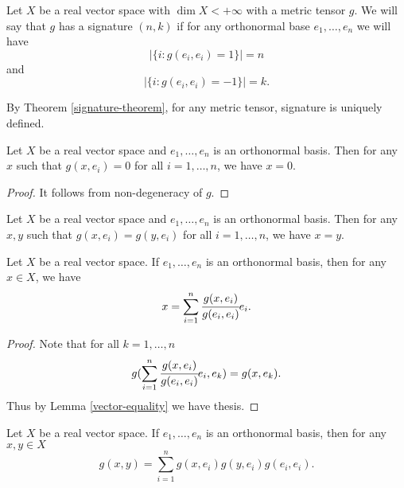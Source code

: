 \documentclass[main.tex]{subfiles}
\begin{document}
\begin{definition}
Let $X$ be a real vector space with $\dim X < +\infty$ with a metric tensor $g$. We will say that $g$ has a signature $(n, k)$ if for any orthonormal base $e_1, \dots, e_n$ we will have 
\begin{equation}
|\{i: g(e_i, e_i) = 1 \}| = n
\end{equation}
and
\begin{equation}
|\{i: g(e_i, e_i) = -1 \}| = k.
\end{equation}
\end{definition}

By Theorem \ref{signature-theorem}, for any metric tensor, signature is uniquely defined. 

\begin{lemma}
Let $X$ be a real vector space and $e_1, \dots, e_n$ is an orthonormal basis. Then for any $x$ such that $g(x, e_i) = 0$ for all $i=1,\dots, n$, we have $x=0$.
\end{lemma}
\begin{proof}
It follows from non-degeneracy of $g$.
\end{proof}
\begin{corollary}
\label{vector-equality}
Let $X$ be a real vector space and $e_1, \dots, e_n$ is an orthonormal basis. Then for any $x,y$ such that $g(x, e_i) = g(y, e_i)$ for all $i=1,\dots, n$, we have $x=y$.
\end{corollary}
\begin{theorem}
Let $X$ be a real vector space. If $e_1, \dots, e_n$ is an orthonormal basis, then for any $x\in X$, we have
\begin{equation}
x = \sum_{i=1}^n \cfrac{g(x,e_i)}{g(e_i, e_i)} e_i.
\end{equation}
\end{theorem}
\begin{proof}
Note that for all $k=1,\dots, n$
\begin{equation}
g(\sum_{i=1}^n \cfrac{g(x, e_i)}{g(e_i, e_i)} e_i, e_k) = g(x, e_k).
\end{equation}
Thus by Lemma \ref{vector-equality} we have thesis.
\end{proof}
\begin{corollary}
Let $X$ be a real vector space. If $e_1, \dots, e_n$ is an orthonormal basis, then for any $x, y\in X$
\begin{equation}
g(x, y) = \sum_{i=1}^n g(x,e_i)g(y,e_i)g(e_i, e_i).
\end{equation}
\end{corollary}
\end{document}
